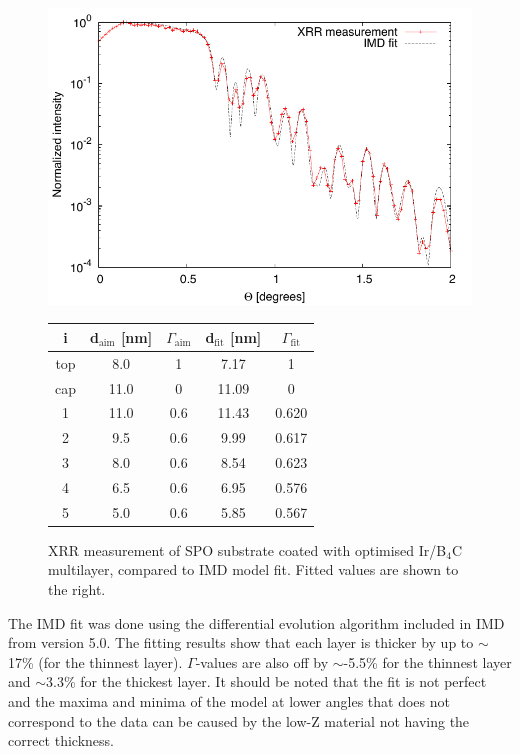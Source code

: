 \begin{figure}[h!]
\centering
\begin{minipage}{.47\textwidth}
  \centering
  \includegraphics[width=\linewidth]{figures/athena/coating_on_spo/120-10-21_fit.pdf}
\end{minipage}%
\begin{minipage}{.53\textwidth}
  \centering
  \footnotesize
\begin{tabular}{c|c|c|c|c}
i&d$_{\text{aim}}$ [nm]&$\Gamma_{\text{aim}}$&d$_{\text{fit}}$ [nm]&$\Gamma_{\text{fit}}$\\
\hline
top&8.0&1&7.17&1\\
cap&11.0&0&11.09&0\\
1&11.0&0.6&11.43&0.620\\
2&9.5&0.6&9.99&0.617\\
3&8.0&0.6&8.54&0.623\\
4&6.5&0.6&6.95&0.576\\
5&5.0&0.6&5.85&0.567
\end{tabular}
\end{minipage}
\caption{\footnotesize XRR measurement of SPO substrate coated with optimised Ir/B$_4$C multilayer, compared to IMD model fit. Fitted values are shown to the right.}\label{fig:ir-b4c-fit}
\end{figure}

The IMD fit was done using the differential evolution algorithm\cite{Bjoerck:2011fy} included in IMD from version 5.0. The fitting results show that each layer is thicker by up to $\sim$17\% (for the thinnest layer). $\Gamma$-values are also off by $\sim$-5.5\% for the thinnest layer and $\sim$3.3\% for the thickest layer. It should be noted that the fit is not perfect and the maxima and minima of the model at lower angles that does not correspond to the data can be caused by the low-Z material not having the correct thickness.

